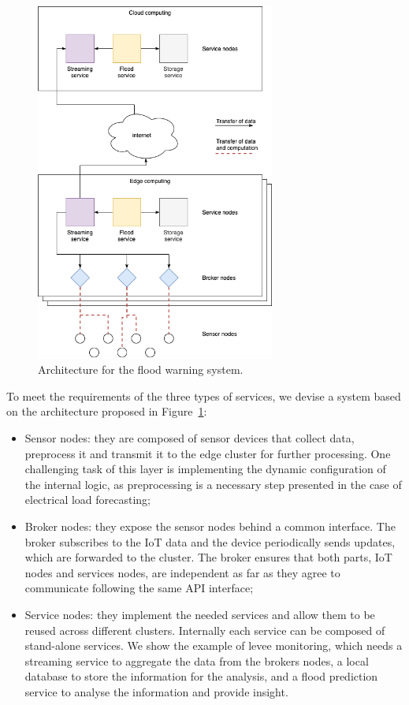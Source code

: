 \begin{figure}[ht]
\centering
\includegraphics[width=0.7\textwidth]{figures/architecture-levee2}
\caption{Architecture for the flood warning system.}
\label{fig:architecture-levee}
\end{figure}

To meet the requirements of the three types of services, we devise a system based on the architecture proposed in Figure~\ref{fig:architecture-levee}:

\begin{itemize}
    \item Sensor nodes: they are composed of sensor devices that collect data, preprocess it and transmit it to the edge cluster for further processing. One challenging task of this layer is implementing the dynamic configuration of the internal logic, as preprocessing is a necessary step presented in the case of electrical load forecasting;
    \item Broker nodes: they expose the sensor nodes behind a common interface. The broker subscribes to the IoT data and the device periodically sends updates, which are forwarded to the cluster. The broker ensures that both parts, IoT nodes and services nodes, are independent as far as they agree to communicate following the same API interface;
    \item Service nodes: they implement the needed services and allow them to be reused across different clusters. Internally each service can be composed of stand-alone services. We show the example of levee monitoring, which needs a streaming service to aggregate the data from the brokers nodes, a local database to store the information for the analysis, and a flood prediction service to analyse the information and provide insight. 
\end{itemize}

